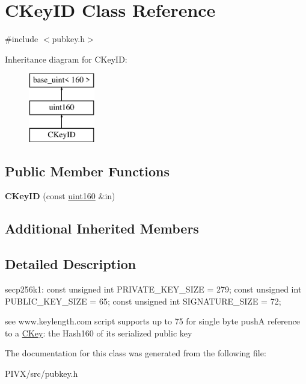\hypertarget{class_c_key_i_d}{}\section{C\+Key\+ID Class Reference}
\label{class_c_key_i_d}


{\ttfamily \#include $<$pubkey.\+h$>$}

Inheritance diagram for C\+Key\+ID\+:\begin{figure}[H]
\begin{center}
\leavevmode
\includegraphics[height=3.000000cm]{class_c_key_i_d}
\end{center}
\end{figure}
\subsection*{Public Member Functions}
\begin{DoxyCompactItemize}
\item 
\mbox{\label{class_c_key_i_d_a695f373e11730318f9103100fa006a7e}} 
{\bfseries C\+Key\+ID} (const \mbox{\hyperlink{classuint160}{uint160}} \&in)
\end{DoxyCompactItemize}
\subsection*{Additional Inherited Members}


\subsection{Detailed Description}
secp256k1\+: const unsigned int P\+R\+I\+V\+A\+T\+E\+\_\+\+K\+E\+Y\+\_\+\+S\+I\+ZE = 279; const unsigned int P\+U\+B\+L\+I\+C\+\_\+\+K\+E\+Y\+\_\+\+S\+I\+ZE = 65; const unsigned int S\+I\+G\+N\+A\+T\+U\+R\+E\+\_\+\+S\+I\+ZE = 72;

see www.\+keylength.\+com script supports up to 75 for single byte pushA reference to a \mbox{\hyperlink{class_c_key}{C\+Key}}\+: the Hash160 of its serialized public key 

The documentation for this class was generated from the following file\+:\begin{DoxyCompactItemize}
\item 
P\+I\+V\+X/src/pubkey.\+h\end{DoxyCompactItemize}
